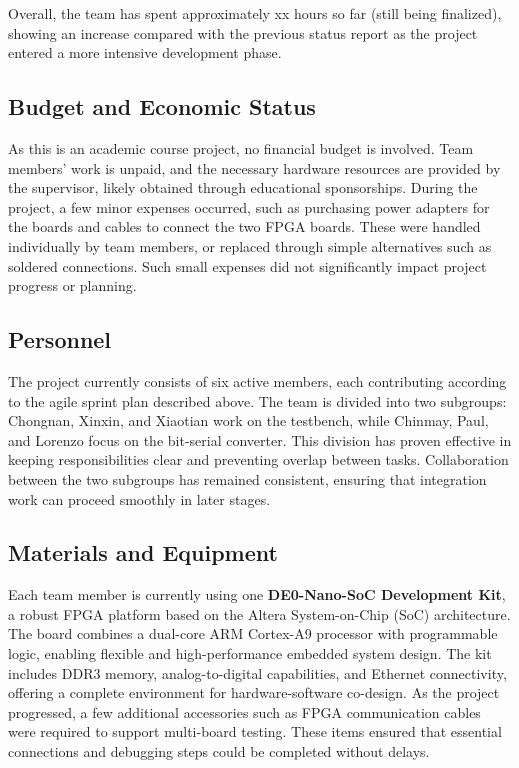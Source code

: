 \documentclass[10pt]{article}
\begin{document}
Overall, the team has spent approximately xx hours so far (still being finalized), showing an increase compared with the previous status report as the project entered a more intensive development phase.

\subsection{Budget and Economic Status}
As this is an academic course project, no financial budget is involved. Team members’ work is unpaid, and the necessary hardware resources are provided by the supervisor, likely obtained through educational sponsorships.
During the project, a few minor expenses occurred, such as purchasing power adapters for the boards and cables to connect the two FPGA boards. These were handled individually by team members, or replaced through simple alternatives such as soldered connections. Such small expenses did not significantly impact project progress or planning.

\subsection{Personnel}
The project currently consists of six active members, each contributing according to the agile sprint plan described above.
The team is divided into two subgroups: Chongnan, Xinxin, and Xiaotian work on the testbench, while Chinmay, Paul, and Lorenzo focus on the bit-serial converter.
This division has proven effective in keeping responsibilities clear and preventing overlap between tasks. Collaboration between the two subgroups has remained consistent, ensuring that integration work can proceed smoothly in later stages.

\subsection{Materials and Equipment}
Each team member is currently using one \textbf{DE0-Nano-SoC Development Kit}, a robust FPGA platform based on the Altera System-on-Chip (SoC) architecture. The board combines a dual-core ARM Cortex-A9 processor with programmable logic, enabling flexible and high-performance embedded system design. The kit includes DDR3 memory, analog-to-digital capabilities, and Ethernet connectivity, offering a complete environment for hardware-software co-design.
As the project progressed, a few additional accessories such as FPGA communication cables were required to support multi-board testing. These items ensured that essential connections and debugging steps could be completed without delays.
\end{document}
